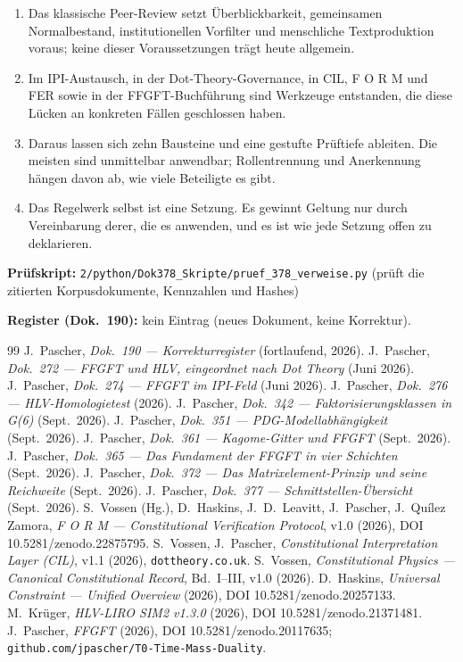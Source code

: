 \begin{enumerate}
\item Das klassische Peer-Review setzt Überblickbarkeit, gemeinsamen Normalbestand,
  institutionellen Vorfilter und menschliche Textproduktion voraus; keine dieser
  Voraussetzungen trägt heute allgemein.
\item Im IPI-Austausch, in der Dot-Theory-Governance, in CIL, F O R M und FER sowie in der
  FFGFT-Buchführung sind Werkzeuge entstanden, die diese Lücken an konkreten Fällen
  geschlossen haben.
\item Daraus lassen sich zehn Bausteine und eine gestufte Prüftiefe ableiten. Die meisten sind
  unmittelbar anwendbar; Rollentrennung und Anerkennung hängen davon ab, wie viele Beteiligte
  es gibt.
\item Das Regelwerk selbst ist eine Setzung. Es gewinnt Geltung nur durch Vereinbarung derer,
  die es anwenden, und es ist wie jede Setzung offen zu deklarieren.
\end{enumerate}

\medskip
\noindent\textbf{Prüfskript:} \texttt{2/python/Dok378\_Skripte/pruef\_378\_verweise.py}
(prüft die zitierten Korpusdokumente, Kennzahlen und Hashes)

\medskip
\noindent\textbf{Register (Dok.~190):} kein Eintrag (neues Dokument, keine Korrektur).

\begin{thebibliography}{99}
 J.~Pascher, \emph{Dok.~190 --- Korrekturregister} (fortlaufend, 2026).
 J.~Pascher, \emph{Dok.~272 --- FFGFT und HLV, eingeordnet nach Dot Theory} (Juni 2026).
 J.~Pascher, \emph{Dok.~274 --- FFGFT im IPI-Feld} (Juni 2026).
 J.~Pascher, \emph{Dok.~276 --- HLV-Homologietest} (2026).
 J.~Pascher, \emph{Dok.~342 --- Faktorisierungsklassen in G(6)} (Sept.~2026).
 J.~Pascher, \emph{Dok.~351 --- PDG-Modellabhängigkeit} (Sept.~2026).
 J.~Pascher, \emph{Dok.~361 --- Kagome-Gitter und FFGFT} (Sept.~2026).
 J.~Pascher, \emph{Dok.~365 --- Das Fundament der FFGFT in vier Schichten} (Sept.~2026).
 J.~Pascher, \emph{Dok.~372 --- Das Matrixelement-Prinzip und seine Reichweite} (Sept.~2026).
 J.~Pascher, \emph{Dok.~377 --- Schnittstellen-Übersicht} (Sept.~2026).
 S.~Vossen (Hg.), D.~Haskins, J.~D.~Leavitt, J.~Pascher, J.~Quílez Zamora,
  \emph{F O R M --- Constitutional Verification Protocol}, v1.0 (2026),
  DOI 10.5281/zenodo.22875795.
 S.~Vossen, J.~Pascher, \emph{Constitutional Interpretation Layer (CIL)}, v1.1 (2026),
  \texttt{dottheory.co.uk}.
 S.~Vossen, \emph{Constitutional Physics --- Canonical Constitutional Record}, Bd.~I--III, v1.0 (2026).
 D.~Haskins, \emph{Universal Constraint --- Unified Overview} (2026), DOI 10.5281/zenodo.20257133.
 M.~Krüger, \emph{HLV-LIRO SIM2 v1.3.0} (2026), DOI 10.5281/zenodo.21371481.
 J.~Pascher, \emph{FFGFT} (2026), DOI 10.5281/zenodo.20117635;
  \texttt{github.com/jpascher/T0-Time-Mass-Duality}.
\end{thebibliography}
